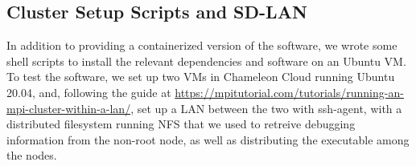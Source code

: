 \subsection*{Cluster Setup Scripts and SD-LAN}
In addition to providing a containerized version of the software, we wrote some shell scripts to install the relevant dependencies and software on an Ubuntu VM. To test the software, we set up two VMs in Chameleon Cloud running Ubuntu 20.04, and, following the guide at \url{https://mpitutorial.com/tutorials/running-an-mpi-cluster-within-a-lan/}, set up a LAN between the two with ssh-agent, with a distributed filesystem running NFS that we used to retreive debugging information from the non-root node, as well as distributing the executable among the nodes.

